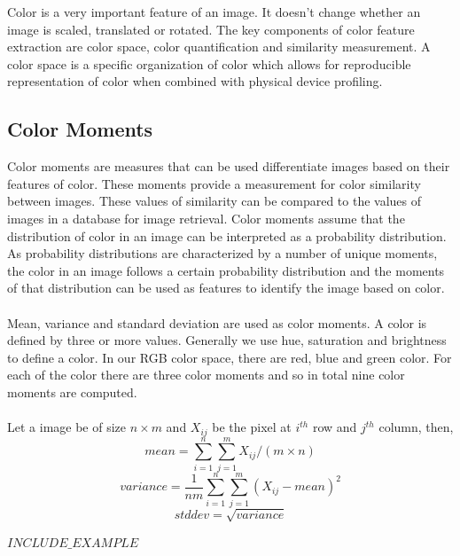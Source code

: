 \documentclass[pstricks,10pt]{report}
\begin{document}
Color is a very important feature of an image. It doesn’t change whether an image is scaled, translated or rotated. The key components of color feature extraction are color space, color quantification and similarity measurement. A color space is a specific organization of color which allows for reproducible representation of color when combined with physical device profiling.

\subsection{Color Moments}
Color moments are measures that can be used differentiate images based on their features of color. These moments provide a measurement for color similarity between images. These values of similarity can be compared to the values of images in a database for image retrieval. Color moments assume that the distribution of color in an image can be interpreted as a probability distribution. As probability distributions are characterized by a number of unique moments, the color in an image follows a certain probability distribution and the moments of that distribution can be used as features to identify the image based on color.\\
\\
Mean, variance and standard deviation are used as color moments. A color is defined by three or more values. Generally we use hue, saturation and brightness to define a color. In our RGB color space, there are red, blue and green color. For each of the color there are three color moments and so in total nine color moments are computed. \\
\\
Let a image be of size $n\times m$ and $X_{ij}$ be the pixel at $i^{th}$ row and $j^{th}$ column, then,\\
\begin{equation}
mean=\sum_{i=1}^{n}\sum_{j=1}^{m}X_{ij}/(m \times n)\label{eq:1}
\end{equation}
\begin{equation}
variance=\frac{1}{nm}\sum_{i=1}^{n}\sum_{j=1}^{m}(X_{ij}-mean)^{2}\label{eq:2}
\end{equation}
\begin{equation}
stddev=\sqrt{variance}\label{eq:3}
\end{equation}

$INCLUDE\_EXAMPLE$\\ 
\end{document}
